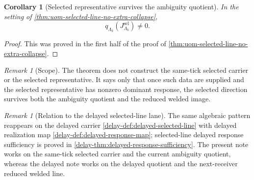 \documentclass[11pt]{article}
\theoremstyle{definition}
\theoremstyle{plain}
\newtheorem{corollary}[definition]{Corollary}
\theoremstyle{remark}
\newtheorem{remark}[definition]{Remark}
\begin{document}
\begin{corollary}[Selected representative survives the ambiguity quotient]
\label{cor:uom-selected-line-quotient-nonzero}
In the setting of \cref{thm:uom-selected-line-no-extra-collapse},
\[
q_{\Lambda_k}(J^{\mathrm{sel}}_{\Lambda_k})\neq 0.
\]
\end{corollary}

\begin{proof}
This was proved in the first half of the proof of
\cref{thm:uom-selected-line-no-extra-collapse}.
\end{proof}

\begin{remark}[Scope]
\label{rem:selected-line-no-extra-collapse-scope}
The theorem does not construct the same-tick selected carrier or the selected representative.
It says only that once such data are supplied and the selected representative has nonzero dominant
response, the selected direction survives both the ambiguity quotient and the reduced welded image.
\end{remark}

\begin{remark}[Relation to the delayed selected-line lane]
\label{rem:selected-line-no-extra-collapse-delay}
The same algebraic pattern reappears on the delayed carrier
\cref{delay-def:delayed-selected-line} with delayed realization map
\cref{delay-def:delayed-response-map}; selected-line delayed response sufficiency is proved in
\cref{delay-thm:delayed-response-sufficiency}.
The present note works on the same-tick selected carrier and the current ambiguity quotient,
whereas the delayed note works on the delayed quotient and the next-receiver reduced welded line.
\end{remark}
\end{document}

